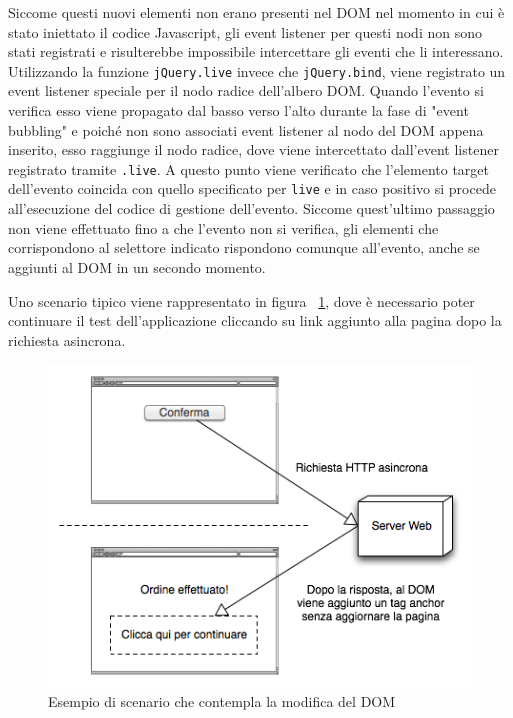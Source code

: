 \documentclass[12pt]{toptesi}
\begin{document}
Siccome questi nuovi elementi non erano presenti nel DOM nel momento in cui è stato iniettato il codice Javascript, gli event listener per questi nodi non sono stati registrati e risulterebbe impossibile intercettare gli eventi che li interessano. Utilizzando la funzione \verb|jQuery.live| invece che \verb|jQuery.bind|, viene registrato un event listener speciale per il nodo radice dell'albero DOM. Quando l'evento si verifica esso viene propagato dal basso verso l'alto durante la fase di "event bubbling" e poiché non sono associati event listener al nodo del DOM appena inserito, esso raggiunge il nodo radice, dove viene intercettato dall'event listener registrato tramite \verb|.live|. A questo punto viene verificato che l'elemento target dell'evento coincida con quello specificato per \verb|live| e in caso positivo si procede all'esecuzione del codice di gestione dell'evento. Siccome quest'ultimo passaggio non viene effettuato fino a che l'evento non si verifica, gli elementi che corrispondono al selettore indicato rispondono comunque all'evento, anche se aggiunti al DOM in un secondo momento.

Uno scenario tipico viene rappresentato in figura ~\ref{fig:liveEventCase}, dove è necessario poter continuare il test dell'applicazione cliccando su link aggiunto alla pagina dopo la richiesta asincrona.

\begin{figure}[htbp]
\begin{center}
\includegraphics[width=\textwidth]{images/live_event_case.png}
\caption{Esempio di scenario che contempla la modifica del DOM}
\label{fig:liveEventCase}
\end{center}
\end{figure}
\end{document}
